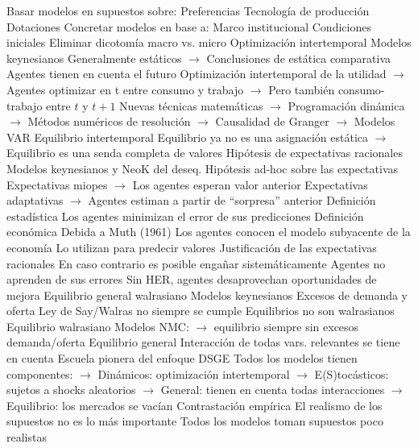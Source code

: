 \documentclass{nuevotema}
\begin{document}
\begin{esquemal}
				\4 Basar modelos en supuestos sobre:
				\4[] Preferencias
				\4[] Tecnología de producción
				\4[] Dotaciones
				\4 Concretar modelos en base a:
				\4[] Marco institucional
				\4[] Condiciones iniciales
				\4 Eliminar dicotomía macro vs. micro
			\3 Optimización intertemporal
				\4 Modelos keynesianos
				\4[] Generalmente estáticos
				\4[] $\to$ Conclusiones de estática comparativa
				\4 Agentes tienen en cuenta el futuro
				\4[] Optimización intertemporal de la utilidad
				\4[] $\to$ Agentes optimizar en t entre consumo y trabajo
				\4[] $\to$ Pero también consumo-trabajo entre $t$ y $t+1$
				\4[] Nuevas técnicas matemáticas
				\4[] $\to$ Programación dinámica
				\4[] $\to$ Métodos numéricos de resolución
				\4[] $\to$ Causalidad de Granger
				\4[] $\to$ Modelos VAR
				\4 Equilibrio intertemporal
				\4[] Equilibrio ya no es una asignación estática
				\4[] $\to$ Equilibrio es una senda completa de valores
			\3 Hipótesis de expectativas racionales
				\4 Modelos keynesianos y NeoK del deseq.
				\4[] Hipótesis ad-hoc sobre las expectativas
				\4[] Expectativas miopes
				\4[] $\to$ Los agentes esperan valor anterior
				\4[] Expectativas adaptativas
				\4[] $\to$ Agentes estiman a partir de ``sorpresa'' anterior
				\4 Definición estadística
				\4[] Los agentes minimizan el error de sus predicciones
				\4 Definición económica
				\4[] Debida a Muth (1961)
				\4[] Los agentes conocen el modelo subyacente de la economía
				\4[] Lo utilizan para predecir valores
				\4 Justificación de las expectativas racionales
				\4[] En caso contrario es posible engañar sistemáticamente
				\4[] Agentes no aprenden de sus errores
				\4[] Sin HER, agentes desaprovechan oportunidades de mejora
			\3 Equilibrio general walrasiano
				\4 Modelos keynesianos
				\4[] Excesos de demanda y oferta
				\4[] Ley de Say/Walras no siempre se cumple
				\4[] Equilibrios no son walrasianos
				\4 Equilibrio walrasiano
				\4[] Modelos NMC:
				\4[] $\to$ equilibrio siempre sin excesos demanda/oferta
				\4 Equilibrio general
				\4[] Interacción de todas vars. relevantes se tiene en cuenta
				\4[$\Rightarrow$] Escuela pionera del enfoque DSGE
				\4[] Todos los modelos tienen componentes:
				\4[] $\to$ Dinámicos: optimización intertemporal
				\4[] $\to$ E(S)tocásticos: sujetos a shocks aleatorios
				\4[] $\to$ General: tienen en cuenta todas interacciones
				\4[] $\to$ Equilibrio: los mercados se vacían
			\3 Contrastación empírica
				\4 El realismo de los supuestos no es lo más importante
				\4[] Todos los modelos toman supuestos poco realistas

\end{esquemal}
\end{document}
